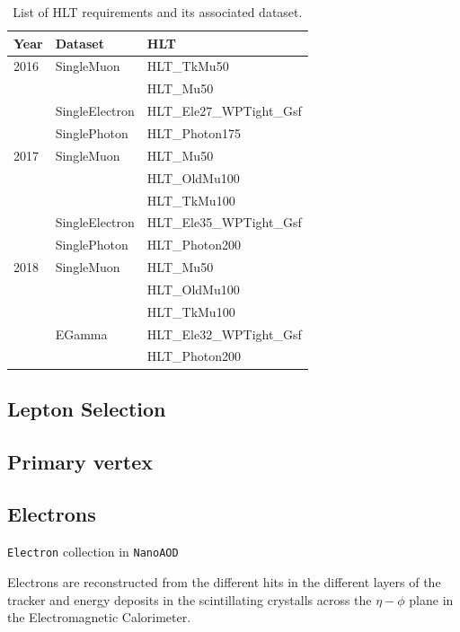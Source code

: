 \begin{table}[h]
\centering
\caption{List of HLT requirements and its associated dataset.}
\begin{tabular}{|l|l|l|}
\hline
Year & Dataset & HLT                \\ \hline
2016 & SingleMuon     & HLT\_TkMu50 \\
     &                & HLT\_Mu50   \\
     & SingleElectron & HLT\_Ele27\_WPTight\_Gsf  \\
     & SinglePhoton   & HLT\_Photon175            \\ \hline
2017 & SingleMuon     & HLT\_Mu50       \\
     &                & HLT\_OldMu100   \\
     &                & HLT\_TkMu100    \\
     & SingleElectron & HLT\_Ele35\_WPTight\_Gsf  \\
     & SinglePhoton   & HLT\_Photon200            \\ \hline
2018 & SingleMuon & HLT\_Mu50     \\
     &            & HLT\_OldMu100 \\
     &            & HLT\_TkMu100  \\ \hline
     & EGamma     & HLT\_Ele32\_WPTight\_Gsf \\
     &            & HLT\_Photon200           \\ \hline
\end{tabular}
\label{tab:Datasets}
\end{table}


\subsection{Lepton Selection}

\subsection{Primary vertex}

\subsection{Electrons}

\verb|Electron| collection in \verb|NanoAOD|

Electrons are reconstructed from the different hits in the different
layers of the tracker and energy deposits in the scintillating crystalls
across the $\eta-\phi$ plane in the Electromagnetic Calorimeter.

